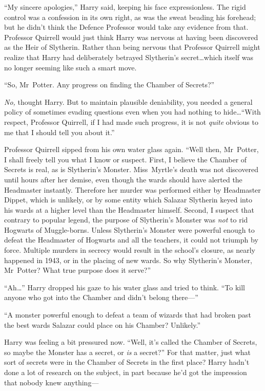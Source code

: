“My sincere apologies,” Harry said, keeping his face expressionless. The rigid control was a confession in its own right, as was the sweat beading his forehead; but he didn’t think the Defence Professor would take any evidence from that. Professor Quirrell would just think Harry was nervous at having been discovered as the Heir of Slytherin. Rather than being nervous that Professor Quirrell might realize that Harry had deliberately betrayed Slytherin’s secret…which itself was no longer seeming like such a smart move.

“So, Mr~Potter. Any progress on finding the Chamber of Secrets?”

\emph{No,} thought Harry. But to maintain plausible deniability, you needed a general policy of sometimes evading questions even when you had nothing to hide…“With respect, Professor Quirrell, if I had made such progress, it is not \emph{quite} obvious to me that I should tell you about it.”

Professor Quirrell sipped from his own water glass again.
“Well then, Mr~Potter, I shall freely tell you what I know or suspect. First, I believe the Chamber of Secrets is real, as is Slytherin’s Monster. Miss~Myrtle’s death was not discovered until hours after her demise, even though the wards should have alerted the Headmaster instantly. Therefore her murder was performed either by Headmaster Dippet, which is unlikely, or by some entity which Salazar Slytherin keyed into his wards at a higher level than the Headmaster himself. Second, I suspect that contrary to popular legend, the purpose of Slytherin’s Monster was \emph{not} to rid Hogwarts of Muggle-borns. Unless Slytherin’s Monster were powerful enough to defeat the Headmaster of Hogwarts and all the teachers, it could not triumph by force. Multiple murders in secrecy would result in the school’s closure, as nearly happened in 1943, or in the placing of new wards. So why Slytherin’s Monster, Mr~Potter? What true purpose does it serve?”

“Ah…” Harry dropped his gaze to his water glass and tried to think.
“To kill anyone who got into the Chamber and didn’t belong there—”

“A monster powerful enough to defeat a team of wizards that had broken past the best wards Salazar could place on his Chamber? Unlikely.”

Harry was feeling a bit pressured now.
“Well, it’s called the Chamber of Secrets, so maybe the Monster has a secret, or \emph{is} a secret?” For that matter, just what sort of secrets were in the Chamber of Secrets in the first place? Harry hadn’t done a lot of research on the subject, in part because he’d got the impression that nobody knew anything—

